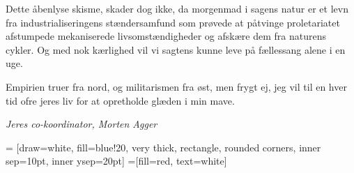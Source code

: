 \begin{minipage}[b]{0.95\linewidth}
\begin{minipage}[t]{0.47\textwidth}
Dette åbenlyse skisme, skader dog ikke, da morgenmad i sagens natur er et levn fra industrialiseringens stændersamfund som prøvede at påtvinge proletariatet afstumpede mekaniserede livsomstændigheder og afskære dem fra naturens cykler. Og med nok kærlighed vil vi sagtens kunne leve på fællessang alene i en uge.

Empirien truer fra nord, og militarismen fra øst, men frygt ej, jeg vil til en hver tid ofre jeres liv for at opretholde glæden i min mave. 

{\flushright\emph{Jeres co-koordinator, Morten Agger}}

\end{minipage}
\hfill\begin{minipage}[t]{0.47\textwidth}

\vspace{1mm}
 = [draw=white, fill=blue!20, very thick,
    rectangle, rounded corners, inner sep=10pt, inner ysep=20pt]
 =[fill=red, text=white]

%


\end{minipage}
\end{minipage}
